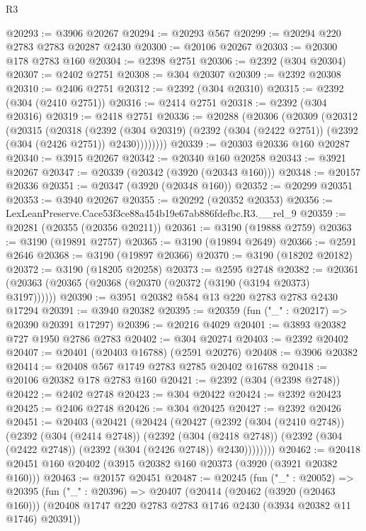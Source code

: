 \begin{lexlean}{R3}
\begin{coremodule}
@20293 := @3906 @20267
@20294 := @20293 @567
@20299 := @20294 @220 @2783 @2783 @20287 @2430
@20300 := @20106 @20267
@20303 := @20300 @178 @2783 @160
@20304 := @2398 @2751
@20306 := @2392 (@304 @20304)
@20307 := @2402 @2751
@20308 := @304 @20307
@20309 := @2392 @20308
@20310 := @2406 @2751
@20312 := @2392 (@304 @20310)
@20315 := @2392 (@304 (@2410 @2751))
@20316 := @2414 @2751
@20318 := @2392 (@304 @20316)
@20319 := @2418 @2751
@20336 := @20288
    (@20306
      (@20309
        (@20312
          (@20315
            (@20318
              (@2392
                (@304 @20319)
                (@2392 (@304 (@2422 @2751)) (@2392 (@304 (@2426 @2751)) @2430))))))))
@20339 := @20303 @20336 @160 @20287
@20340 := @3915 @20267
@20342 := @20340 @160 @20258
@20343 := @3921 @20267
@20347 := @20339 (@20342 (@3920 (@20343 @160)))
@20348 := @20157 @20336
@20351 := @20347 (@3920 (@20348 @160))
@20352 := @20299 @20351
@20353 := @3940 @20267
@20355 := @20292 (@20352 @20353)
@20356 := LexLeanPreserve.Cace53f3ce88a454b19e67ab886fdefbc.R3.__rel_9
@20359 := @20281 (@20355 (@20356 @20211))
@20361 := @3190 (@19888 @2759)
@20363 := @3190 (@19891 @2757)
@20365 := @3190 (@19894 @2649)
@20366 := @2591 @2646
@20368 := @3190 (@19897 @20366)
@20370 := @3190 (@18202 @20182)
@20372 := @3190 (@18205 @20258)
@20373 := @2595 @2748
@20382 := @20361 (@20363 (@20365 (@20368 (@20370 (@20372 (@3190 (@3194 @20373) @3197))))))
@20390 := @3951 @20382 @584 @13 @220 @2783 @2783 @2430 @17294
@20391 := @3940 @20382
@20395 := @20359 (fun ("_" : @20217) => @20390 @20391 @17297)
@20396 := @20216 @4029
@20401 := @3893 @20382 @727 @1950 @2786 @2783
@20402 := @304 @20274
@20403 := @2392 @20402
@20407 := @20401 (@20403 @16788) (@2591 @20276)
@20408 := @3906 @20382
@20414 := @20408 @567 @1749 @2783 @2785 @20402 @16788
@20418 := @20106 @20382 @178 @2783 @160
@20421 := @2392 (@304 (@2398 @2748))
@20422 := @2402 @2748
@20423 := @304 @20422
@20424 := @2392 @20423
@20425 := @2406 @2748
@20426 := @304 @20425
@20427 := @2392 @20426
@20451 := @20403
    (@20421
      (@20424
        (@20427
          (@2392
            (@304 (@2410 @2748))
            (@2392
              (@304 (@2414 @2748))
              (@2392
                (@304 (@2418 @2748))
                (@2392 (@304 (@2422 @2748)) (@2392 (@304 (@2426 @2748)) @2430))))))))
@20462 := @20418 @20451 @160 @20402 (@3915 @20382 @160 @20373 (@3920 (@3921 @20382 @160)))
@20463 := @20157 @20451
@20487 := @20245
    (fun ("_" : @20052) =>
    @20395
      (fun ("_" : @20396) =>
      @20407
        (@20414
          (@20462 (@3920 (@20463 @160)))
          (@20408 @1747 @220 @2783 @2783 @1746 @2430 (@3934 @20382 @11 @1746) @20391))

\end{coremodule}
\end{lexlean}
